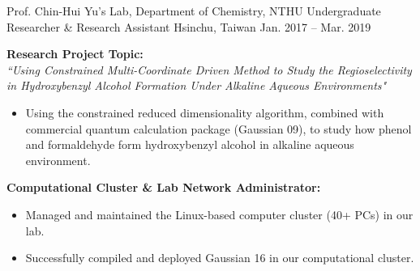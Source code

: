 \begin{cventries}
\cventry
{Prof. Chin-Hui Yu's Lab, Department of Chemistry, NTHU} %
{Undergraduate Researcher \& Research Assistant}
{Hsinchu, Taiwan} %
{Jan. 2017 -- Mar. 2019}
{
\begin{minipage}{\textwidth}
\textbf{Research Project Topic:}\\
\textit{``Using Constrained Multi-Coordinate Driven Method to Study the Regioselectivity in Hydroxybenzyl Alcohol Formation Under Alkaline Aqueous Environments"}
\begin{itemize}
    \item Using the constrained reduced dimensionality algorithm, combined with commercial quantum calculation package (Gaussian 09), to study how phenol and formaldehyde form hydroxybenzyl alcohol in alkaline aqueous environment. 
\end{itemize}
\textbf{Computational Cluster \& Lab Network Administrator:}
\begin{itemize}
    \item Managed and maintained the Linux-based computer cluster (40+ PCs) in our lab.
    \item Successfully compiled and deployed Gaussian 16 in our computational cluster.
\end{itemize}
\end{minipage}
}



\end{cventries}
